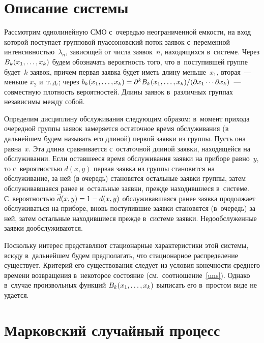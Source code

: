 \begin{multicols}{2}
\vspace*{-4pt}

\section{Описание системы}

\vspace*{-2pt}

Рассмотрим однолинейную СМО с~очередью неограниченной емкости,
на вход которой поступает групповой пуассоновский поток заявок с~переменной 
интенсивностью~$\lambda_n$, зависящей от числа заявок~$n$, находящихся в~системе.
Через $B_k(x_1,\ldots,x_k)$ будем обозначать вероятность того, что в~поступившей
группе будет~$k$ заявок, причем первая заявка будет иметь
длину меньше~$x_1$, вторая~--- меньше $x_2$ и~т.\,д.;
через $b_k(x_1,\ld,x_k)\hm=
\partial^k B_k(x_1,\ld,x_k)/(\partial x_1\cdots \partial x_k)$~--- 
совместную плотность вероятностей.
Длины заявок в~различных группах независимы между собой.

Определим дисциплину обслуживания сле\-ду\-ющим образом:
в~момент прихода очередной группы заявок замеряется
остаточное время обслуживания (в дальнейшем будем называть его
длиной) первой заявки из группы.
Пусть она равна~$x$. Эта длина сравнивается с~остаточной длиной
заявки, находящейся на обслуживании. Если
оставшееся время обслуживания заявки на приборе равно~$y$,
то с~вероятностью $d(x,y)$ первая заявка из группы становится на
обслуживание, за ней (в очередь) становятся остальные заявки группы,
затем обслуживавшаяся ранее и~остальные заявки, прежде находившиеся в~системе.
С~вероятностью $\d(x,y)\hm=1\hm-d(x,y)$ обслуживавшаяся ранее заявка продолжает
обслуживаться на приборе, вновь поступившие заявки становятся (в~очередь) за ней,
затем остальные находившиеся прежде в~системе заявки.
Недообслуженные заявки дообслуживаются.

Поскольку  интерес представляют стационарные характеристики
этой системы, всюду в~дальнейшем будем предполагать,
что стационарное распределение существует.
Критерий его существования следует
из условия конечности среднего времени
возвращения в~некоторое состояние (см.\ соотношение~\eqref{uns}).
Однако в~случае произвольных функций $B_k(x_1,\ldots,x_k)$
выписать его в~простом виде не удается.

\vspace*{-4pt}

\section{Марковский случайный процесс}


\end{multicols}

